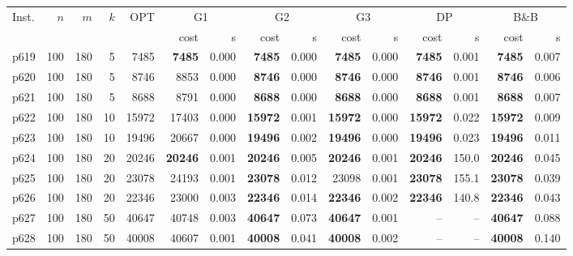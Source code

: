 \begin{longtable}{@{}lrrrr@{\hspace{9pt}}rr@{\hspace{9pt}}rr@{\hspace{9pt}}rr@{\hspace{9pt}}rr@{\hspace{9pt}}rr@{}}\toprule
Inst. & \(n\) & \(m\) & \(k\) & OPT & \multicolumn{2}{c}{G1} & \multicolumn{2}{c}{G2} & \multicolumn{2}{c}{G3} & \multicolumn{2}{c}{DP} & \multicolumn{2}{c}{B\&B}\\
\cmidrule(l{6pt}){6-7}\cmidrule(l{6pt}){8-9}\cmidrule(l{6pt}){10-11}\cmidrule(l{6pt}){12-13}\cmidrule(l{6pt}){14-15}
 & & & & & cost & s & cost & s & cost & s & cost & s & cost & s\\\midrule\endhead
p619 & 100 & 180 & 5 & 7485 & \textbf{7485} & 0.000 & \textbf{7485} & 0.000 & \textbf{7485} & 0.000 & \textbf{7485} & 0.001 & \textbf{7485} & 0.007\\
p620 & 100 & 180 & 5 & 8746 & 8853 & 0.000 & \textbf{8746} & 0.000 & \textbf{8746} & 0.000 & \textbf{8746} & 0.001 & \textbf{8746} & 0.006\\
p621 & 100 & 180 & 5 & 8688 & 8791 & 0.000 & \textbf{8688} & 0.000 & \textbf{8688} & 0.000 & \textbf{8688} & 0.001 & \textbf{8688} & 0.007\\
p622 & 100 & 180 & 10 & 15972 & 17403 & 0.000 & \textbf{15972} & 0.001 & \textbf{15972} & 0.000 & \textbf{15972} & 0.022 & \textbf{15972} & 0.009\\
p623 & 100 & 180 & 10 & 19496 & 20667 & 0.000 & \textbf{19496} & 0.002 & \textbf{19496} & 0.000 & \textbf{19496} & 0.023 & \textbf{19496} & 0.011\\
p624 & 100 & 180 & 20 & 20246 & \textbf{20246} & 0.001 & \textbf{20246} & 0.005 & \textbf{20246} & 0.001 & \textbf{20246} & 150.0 & \textbf{20246} & 0.045\\
p625 & 100 & 180 & 20 & 23078 & 24193 & 0.001 & \textbf{23078} & 0.012 & 23098 & 0.001 & \textbf{23078} & 155.1 & \textbf{23078} & 0.039\\
p626 & 100 & 180 & 20 & 22346 & 23000 & 0.003 & \textbf{22346} & 0.014 & \textbf{22346} & 0.002 & \textbf{22346} & 140.8 & \textbf{22346} & 0.043\\
p627 & 100 & 180 & 50 & 40647 & 40748 & 0.003 & \textbf{40647} & 0.073 & \textbf{40647} & 0.001 & -- & -- & \textbf{40647} & 0.088\\
p628 & 100 & 180 & 50 & 40008 & 40607 & 0.001 & \textbf{40008} & 0.041 & \textbf{40008} & 0.002 & -- & -- & \textbf{40008} & 0.140\\

\end{longtable}
